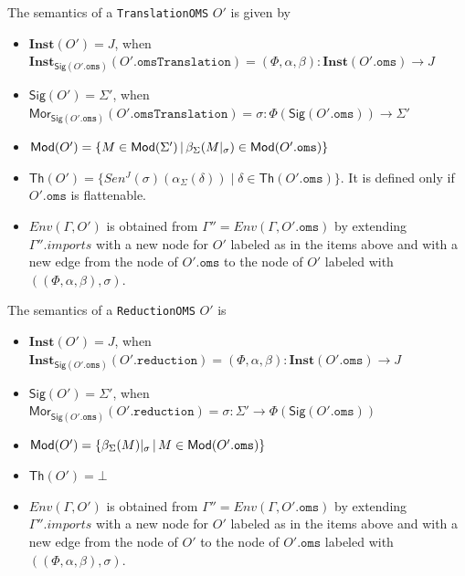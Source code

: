 \documentclass[10pt,fleqn,final]{scrreprt}
\newcommand*{\syntax}[1]{\texttt{#1}}
\newcommand{\Sig}{\mathsf{Sig}}
\renewcommand{\Th}{\mathsf{Th}}
\newcommand{\Mor}{\mathsf{Mor}}
\newcommand{\Inst}{\ensuremath{\mathbf{Inst}}}
\newenvironment{definitions}[0]{\medskip }{}
\begin{document}
\begin{definitions}

The semantics of a \syntax{TranslationOMS} $O'$ is given by
\begin{itemize}
 \item $\Inst(O') = J$, when $\Inst_{\Sig(O'.\syntax{oms})}(O'.\syntax{omsTranslation}) = (\Phi, \alpha, \beta) : \Inst(O'.\syntax{oms}) \to J$ 
 \item $\Sig(O') = \Sigma'$, when $\Mor_{\Sig(O'.\syntax{oms})}(O'.\syntax{omsTranslation}) = \sigma:\Phi(\Sig(O'.\syntax{oms}))\to \Sigma'$
 \item $\Mod(O') = \{M \in \Mod(\Sigma') \,|\, \beta_\Sigma(M\forget\sigma)\in \Mod(O'.\syntax{oms})\}$
 \item $\Th(O') = \{   Sen^J(\sigma)(\alpha_\Sigma(\delta))  \mid \delta \in \Th(O'.\syntax{oms}) \}$. It is defined only if $O'.\syntax{oms}$ is flattenable.
 \item $Env(\Gamma, O')$ is obtained from 
       $\Gamma'' = Env(\Gamma, O'.\syntax{oms})$
       by extending $\Gamma''.imports$
        with a new node for $O'$ labeled as in the items above
        and with a new edge from the node of $O'.\syntax{oms}$ to the node of $O'$
        labeled with $((\Phi, \alpha, \beta), \sigma)$.
\end{itemize}

The semantics of a \syntax{ReductionOMS} $O'$ is
\begin{itemize}

  \item $\Inst(O') = J$, when $\Inst_{\Sig(O'.\syntax{oms})}(O'.\syntax{reduction})
  = (\Phi, \alpha, \beta) : \Inst(O'.\syntax{oms}) \to J$
  \item $\Sig(O') = \Sigma'$, when
   $\Mor_{\Sig(O'.\syntax{oms})}(O'.\syntax{reduction}) = \sigma:\Sigma'\to
    \Phi(\Sig(O'.\syntax{oms}))$
  \item $\Mod(O') = \{\beta_\Sigma(M)\forget{\sigma} \,|\, M\in \Mod(O'.\syntax{oms})\}$
  \item $\Th(O') = \bot$
  \item $Env(\Gamma, O')$ is obtained from 
       $\Gamma'' = Env(\Gamma, O'.\syntax{oms})$
       by extending $\Gamma''.imports$
        with a new node for $O'$ labeled as in the items above
        and with a new edge from the node of $O'$ to the node of 
        $O'.\syntax{oms}$ labeled with
        $((\Phi, \alpha, \beta),\sigma)$.
\end{itemize}



\end{definitions}
\end{document}
